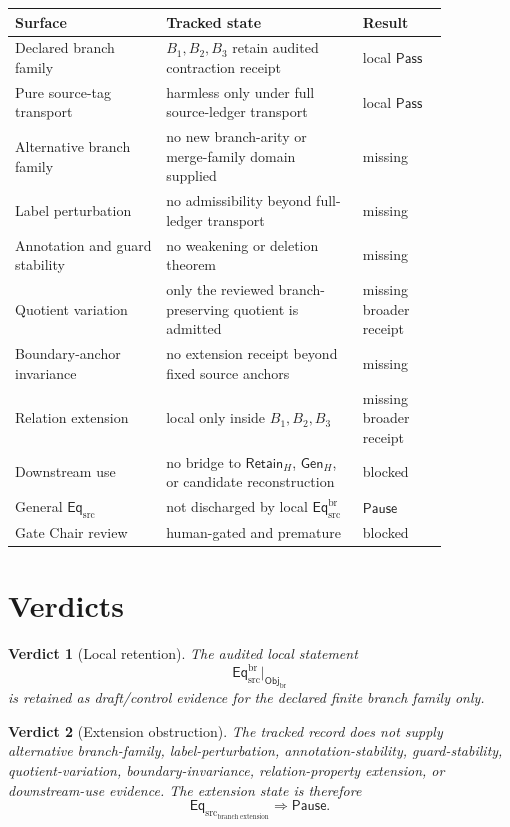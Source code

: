 \documentclass[11pt]{article}
\newcommand{\EqSrc}{\mathsf{Eq}_{\mathrm{src}}}
\newcommand{\EqBr}{\mathsf{Eq}_{\mathrm{src}}^{\mathrm{br}}}
\newcommand{\ObjBr}{\mathsf{Obj}_{\mathrm{br}}}
\newcommand{\RetainH}{\mathsf{Retain}_{H}}
\newcommand{\GenH}{\mathsf{Gen}_{H}}
\newcommand{\Pass}{\mathsf{Pass}}
\newcommand{\Pause}{\mathsf{Pause}}
\newtheorem{verdict}{Verdict}
\begin{document}
\begin{center}
\begin{tabular}{p{0.30\linewidth}p{0.39\linewidth}p{0.17\linewidth}}
\textbf{Surface} & \textbf{Tracked state} & \textbf{Result} \\
\hline
Declared branch family & \(B_{1},B_{2},B_{3}\) retain audited contraction receipt & local \(\Pass\) \\
Pure source-tag transport & harmless only under full source-ledger transport & local \(\Pass\) \\
Alternative branch family & no new branch-arity or merge-family domain supplied & missing \\
Label perturbation & no admissibility beyond full-ledger transport & missing \\
Annotation and guard stability & no weakening or deletion theorem & missing \\
Quotient variation & only the reviewed branch-preserving quotient is admitted & missing broader receipt \\
Boundary-anchor invariance & no extension receipt beyond fixed source anchors & missing \\
Relation extension & local only inside \(B_{1},B_{2},B_{3}\) & missing broader receipt \\
Downstream use & no bridge to \(\RetainH\), \(\GenH\), or candidate reconstruction & blocked \\
General \(\EqSrc\) & not discharged by local \(\EqBr\) & \(\Pause\) \\
Gate Chair review & human-gated and premature & blocked \\
\end{tabular}
\end{center}

\section{Verdicts}

\begin{verdict}[Local retention]
The audited local statement
\[
    \EqBr\big|_{\ObjBr}
\]
is retained as draft/control evidence for the declared finite branch
family only.
\end{verdict}

\begin{verdict}[Extension obstruction]
The tracked record does not supply alternative branch-family,
label-perturbation, annotation-stability, guard-stability,
quotient-variation, boundary-invariance, relation-property extension, or
downstream-use evidence. The extension state is therefore
\[
    \EqSrc_{\mathrm{branch\ extension}}\Rightarrow \Pause.
\]
\end{verdict}
\end{document}

